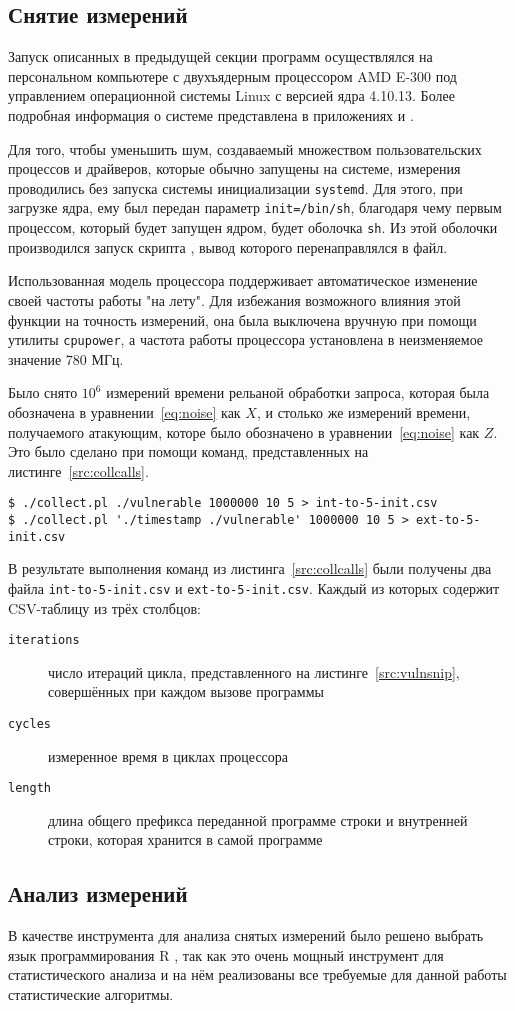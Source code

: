 \subsection{Снятие измерений}

Запуск описанных в предыдущей секции программ осуществлялся на персональном компьютере с двухъядерным
процессором AMD E-300 под управлением операционной системы Linux с версией ядра
4.10.13. Более подробная информация о системе представлена в приложениях
 и .

Для того, чтобы уменьшить шум, создаваемый множеством пользовательских процессов
и драйверов, которые обычно запущены на системе, измерения проводились без запуска
системы инициализации \texttt{systemd}. Для этого, при загрузке ядра, ему был
передан параметр \texttt{init=/bin/sh}, благодаря чему первым процессом, который
будет запущен ядром, будет оболочка \texttt{sh}. Из этой оболочки производился
запуск скрипта , вывод которого перенаправлялся в файл.

Использованная модель процессора поддерживает автоматическое изменение своей частоты
работы "на лету". Для избежания возможного влияния этой функции на точность измерений,
она была выключена вручную при помощи утилиты \texttt{cpupower},
а частота работы процессора установлена в неизменяемое значение 780 МГц.

Было снято $10^6$ измерений времени рельаной обработки запроса, которая была обозначена в
уравнении~\ref{eq:noise} как $X$, и столько же измерений времени, получаемого атакующим,
которе было обозначено в уравнении~\ref{eq:noise} как $Z$. Это было сделано при помощи
команд, представленных на листинге~\ref{src:collcalls}.

\begin{lstlisting}[caption=Команды снятия измерений, label=src:collcalls]
$ ./collect.pl ./vulnerable 1000000 10 5 > int-to-5-init.csv
$ ./collect.pl './timestamp ./vulnerable' 1000000 10 5 > ext-to-5-init.csv
\end{lstlisting}

В результате выполнения команд из листинга~\ref{src:collcalls} были получены два файла
\texttt{int-to-5-init.csv} и \texttt{ext-to-5-init.csv}. Каждый из которых содержит CSV-таблицу
из трёх столбцов:

\begin{description}
\item [\texttt{iterations}] число итераций цикла, представленного на
  листинге~\ref{src:vulnsnip}, совершённых при каждом вызове программы 
\item [\texttt{cycles}] измеренное время в циклах процессора
\item [\texttt{length}] длина общего префикса переданной программе  строки и
  внутренней строки, которая хранится в самой программе
\end{description}

\subsection{Анализ измерений}

В качестве инструмента для анализа снятых измерений было решено выбрать язык программирования
R \cite{r}, так как это очень мощный инструмент для статистического анализа и на нём реализованы
все требуемые для данной работы статистические алгоритмы.

\clearpage
